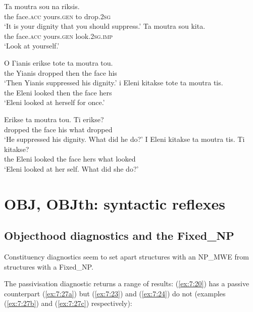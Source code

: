 \documentclass[output=paper]{langsci/langscibook}
\begin{document}
\ea%
    \label{ex:7:24}
\ea  \label{ex:7:24a}
\gll   Ta moutra sou na riksis.\\
                the face.\textsc{acc} yours.\textsc{gen} to drop.\textsc{2sg}\\
\glt             `It is your dignity that you should suppress.'
\ex  \label{ex:7:24b}
\gll  Ta moutra sou kita.\\
                the face.\textsc{acc} yours.\textsc{gen} look.\textsc{2sg.imp}\\
\glt            `Look at yourself.'
\z
\z

\ea%
    \label{ex:7:25}
\ea     \label{ex:7:25a}

\gll O Γianis erikse tote ta moutra tou.\\
                 the Yianis dropped then the face his \\
\glt             `Then Yianis suppressed his dignity.'
\ex     \label{ex:7:25b}
\gll   i Eleni kitakse tote ta moutra tis.\\
                 the Eleni looked then the face hers\\
\glt             `Eleni looked at herself for once.'
\z
\z

\ea%
    \label{ex:7:26}
\ea   \label{ex:7:26a}

\gll Erikse ta moutra tou. Ti erikse?\\
                 dropped the face his what dropped\\
\glt                `He suppressed his dignity. What did he do?'
\ex   \label{ex:7:26b}
\gll I Eleni kitakse ta moutra tis. Ti  kitakse?\\
                 the Eleni looked the face hers what looked \\
 \glt               `Eleni looked at her self. What did she do?'
\z
\z

\section{OBJ, OBJth: syntactic reflexes}
\label{sec:3}

\subsection{Objecthood diagnostics and the Fixed\_NP}

Constituency diagnostics seem to set apart structures with an NP\_MWE from structures with a Fixed\_NP.

The passivisation diagnostic returns a range of results: (\ref{ex:7:20}) has a passive counterpart (\ref{ex:7:27a}) but (\ref{ex:7:23}) and (\ref{ex:7:24}) do not (examples (\ref{ex:7:27b}) and (\ref{ex:7:27c}) respectively):
\end{document}
